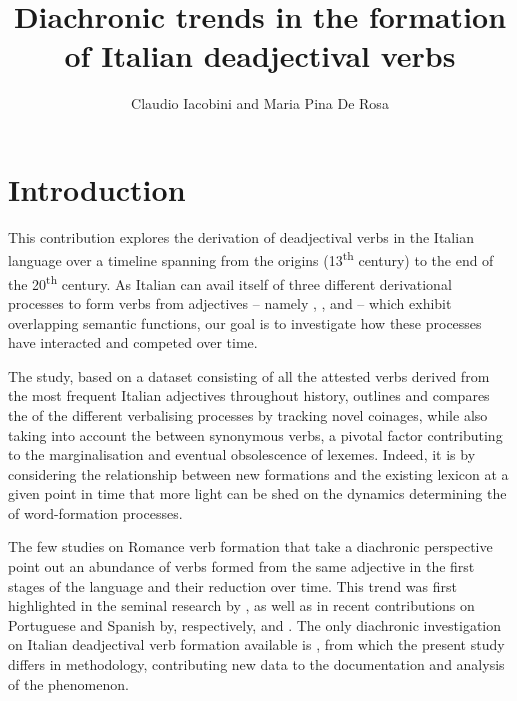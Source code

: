 \documentclass[output=paper,colorlinks,citecolor=brown]{langscibook}
\author{Claudio Iacobini\affiliation{Università degli Studi Roma Tre} and Maria Pina De Rosa\affiliation{Università degli Studi di Salerno}}
\title{Diachronic trends in the formation of Italian deadjectival verbs}
\begin{document}
\maketitle

 
\section{Introduction}

This contribution explores the derivation of deadjectival verbs in the Italian language over a timeline spanning from the origins (13\textsuperscript{th} century) to the end of the 20\textsuperscript{th} century. As Italian can avail itself of three different derivational processes to form verbs from adjectives -- namely , , and  -- which exhibit overlapping semantic functions, our goal is to investigate how these processes have interacted and competed over time.

The study, based on a dataset consisting of all the attested verbs derived from the most frequent Italian adjectives  throughout history, outlines and compares the  of the different verbalising processes by tracking novel coinages, while also taking into account the  between synonymous verbs, a pivotal factor contributing to the marginalisation and eventual obsolescence of lexemes. Indeed, it is by considering the relationship between new formations and the existing lexicon at a given point in time that more light can be shed on the dynamics determining the  of word-formation processes.

The few studies on Romance verb formation that take a diachronic perspective point out an abundance of verbs formed from the same adjective in the first stages of the language and their reduction over time. This trend was first highlighted in the seminal research by \citet{Malkiel1941}, as well as in recent contributions on Portuguese and Spanish by, respectively, \citet{Rio-Torto2019} and \citet{Espejel2023}. The only diachronic investigation on Italian deadjectival verb formation available is \citet{GrossmannIacobini2025}, from which the present study differs in methodology, contributing new data to the documentation and analysis of the phenomenon.
\end{document}
